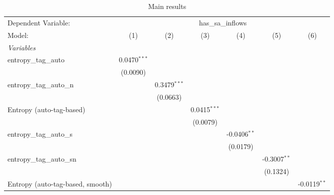
\begin{table}[htbp]
   \centering
   \caption{\label{tab:reg_has_sa_inflows_tag_auto.tex} Main results}
   \begin{footnotesize}
      \begin{tabular}{lcccccc}
         \tabularnewline\midrule\midrule
         Dependent Variable: & \multicolumn{6}{c}{has\_sa\_inflows}\\
         Model:                           & (1)            & (2)            & (3)            & (4)            & (5)            & (6)\\
         \midrule \emph{Variables} &   &   &   &   &   &  \\
         entropy\_tag\_auto             & 0.0470$^{***}$ &                &                &                &                &   \\
                                          & (0.0090)       &                &                &                &                &   \\
         entropy\_tag\_auto\_n         &                & 0.3479$^{***}$ &                &                &                &   \\
                                          &                & (0.0663)       &                &                &                &   \\
         Entropy (auto-tag-based)         &                &                & 0.0415$^{***}$ &                &                &   \\
                                          &                &                & (0.0079)       &                &                &   \\
         entropy\_tag\_auto\_s         &                &                &                & -0.0406$^{**}$ &                &   \\
                                          &                &                &                & (0.0179)       &                &   \\
         entropy\_tag\_auto\_sn        &                &                &                &                & -0.3007$^{**}$ &   \\
                                          &                &                &                &                & (0.1324)       &   \\
         Entropy (auto-tag-based, smooth) &                &                &                &                &                & -0.0119$^{**}$\\

\end{tabular}
\end{footnotesize}
\end{table}
